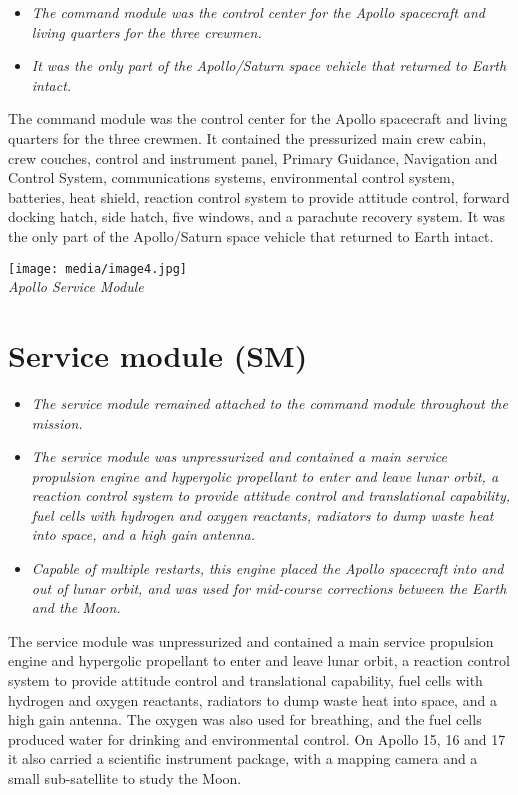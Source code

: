 \begin{itemize}
\item
  \emph{The command module was the control center for the Apollo
  spacecraft and living quarters for the three crewmen.}
\item
  \emph{It was the only part of the Apollo/Saturn space vehicle that
  returned to Earth intact.}
\end{itemize}

The command module was the control center for the Apollo spacecraft and
living quarters for the three crewmen. It contained the pressurized main
crew cabin, crew couches, control and instrument panel, Primary
Guidance, Navigation and Control System, communications systems,
environmental control system, batteries, heat shield, reaction control
system to provide attitude control, forward docking hatch, side hatch,
five windows, and a parachute recovery system. It was the only part of
the Apollo/Saturn space vehicle that returned to Earth intact.

\texttt{[image: media/image4.jpg]}\\
\emph{Apollo Service Module}

\section{Service module (SM)}\label{service-module-sm}

\begin{itemize}
\item
  \emph{The service module remained attached to the command module
  throughout the mission.}
\item
  \emph{The service module was unpressurized and contained a main
  service propulsion engine and hypergolic propellant to enter and leave
  lunar orbit, a reaction control system to provide attitude control and
  translational capability, fuel cells with hydrogen and oxygen
  reactants, radiators to dump waste heat into space, and a high gain
  antenna.}
\item
  \emph{Capable of multiple restarts, this engine placed the Apollo
  spacecraft into and out of lunar orbit, and was used for mid-course
  corrections between the Earth and the Moon.}
\end{itemize}

The service module was unpressurized and contained a main service
propulsion engine and hypergolic propellant to enter and leave lunar
orbit, a reaction control system to provide attitude control and
translational capability, fuel cells with hydrogen and oxygen reactants,
radiators to dump waste heat into space, and a high gain antenna. The
oxygen was also used for breathing, and the fuel cells produced water
for drinking and environmental control. On Apollo 15, 16 and 17 it also
carried a scientific instrument package, with a mapping camera and a
small sub-satellite to study the Moon.

